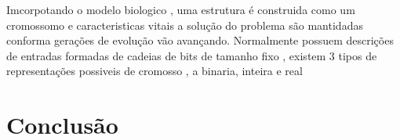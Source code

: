 \documentclass[a4paper,11pt]{article}
\begin{document}
\begin{multicols}{2}
Imcorpotando o modelo biologico , uma estrutura é construida como um cromossomo e caracteristicas vitais a solução do problema 
são mantidadas conforma gerações de evolução vão avançando. Normalmente possuem descrições de entradas formadas de cadeias de bits
de tamanho fixo , existem 3 tipos de representações possiveis de cromosso , a binaria, inteira e real






\section{Conclusão}


\end{multicols}


\end{document}
